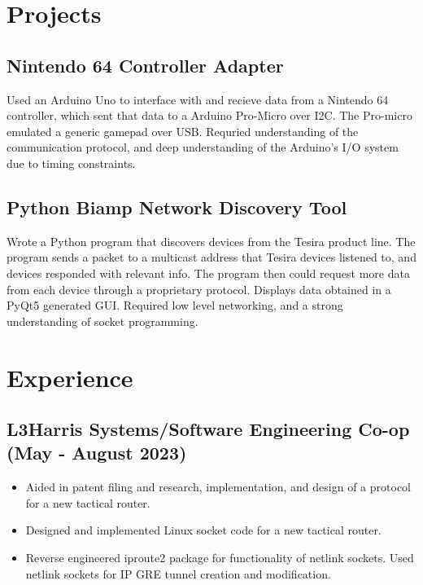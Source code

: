 \documentclass{article}
\begin{document}
\section{Projects}
    \subsection{Nintendo 64 Controller Adapter}
    Used an Arduino Uno to interface with and recieve data from a Nintendo 64
    controller, which sent that data to a Arduino Pro-Micro over I2C. The
    Pro-micro emulated a generic gamepad over USB. Requried understanding of the
    communication protocol, and deep understanding of the Arduino's I/O system due 
    to timing constraints.

    \subsection{Python Biamp Network Discovery Tool}
    Wrote a Python program that discovers devices from the Tesira
    product line. The program sends a packet to a multicast address that Tesira
    devices listened to, and devices responded with relevant info. The program
    then could request more data from each device through a proprietary
    protocol. Displays data obtained in a PyQt5 generated GUI. Required low level 
    networking, and a strong understanding of socket programming.


\section{Experience}

    \subsection{L3Harris Systems/Software Engineering Co-op \hfill (May -
    August 2023)}
        \begin{itemize}[noitemsep]
            \item Aided in patent filing and research, implementation, and
                design of a protocol for a new tactical router.
            \item Designed and implemented Linux socket code for a new tactical
                router.
            \item Reverse engineered iproute2 package for functionality of
                netlink sockets. Used netlink sockets for IP GRE tunnel creation and
                modification.
        \end{itemize}
\end{document}
